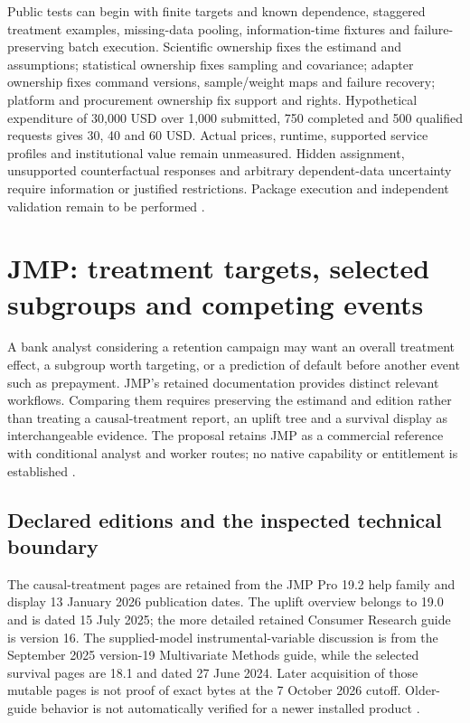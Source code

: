 Public tests can begin with finite targets and known dependence, staggered
treatment examples, missing-data pooling, information-time fixtures and
failure-preserving batch execution. Scientific ownership fixes the estimand
and assumptions; statistical ownership fixes sampling and covariance;
adapter ownership fixes command versions, sample/weight maps and failure
recovery; platform and procurement ownership fix support and rights.
Hypothetical expenditure of 30,000 USD over 1,000 submitted, 750 completed
and 500 qualified requests gives 30, 40 and 60 USD. Actual prices, runtime,
supported service profiles and institutional value remain unmeasured.
Hidden assignment, unsupported counterfactual responses and arbitrary
dependent-data uncertainty require information or justified restrictions.
Package execution and independent validation remain to be performed \citep{exec24_stata_choice}.


\section{JMP: treatment targets, selected subgroups and competing events}
\label{sec:exec24-jmp-reuse}

A bank analyst considering a retention campaign may want an overall
treatment effect, a subgroup worth targeting, or a prediction of default
before another event such as prepayment. JMP's retained documentation
provides distinct relevant workflows. Comparing them requires preserving
the estimand and edition rather than treating a causal-treatment report,
an uplift tree and a survival display as interchangeable evidence. The
proposal retains JMP as a commercial reference with conditional analyst
and worker routes; no native capability or entitlement is established
\citep{exec13_ch_jmp_causal,exec13_ch_jmp_uplift,exec14_survival_jmp,
exec24_jmp_choice}.

\subsection{Declared editions and the inspected technical boundary}
The causal-treatment pages are retained from the JMP Pro 19.2 help family
and display 13 January 2026 publication dates. The uplift overview belongs
to 19.0 and is dated 15 July 2025; the more detailed retained Consumer
Research guide is version 16. The supplied-model instrumental-variable
discussion is from the September 2025 version-19 Multivariate Methods
guide, while the selected survival pages are 18.1 and dated 27 June 2024.
Later acquisition of those mutable pages is not proof of exact bytes at
the 7 October 2026 cutoff. Older-guide behavior is not automatically
verified for a newer installed product
\citep{exec13_ch_jmp_causal,exec13_ch_jmp_uplift,exec13_ivrd_jmp,
exec14_survival_jmp}.

